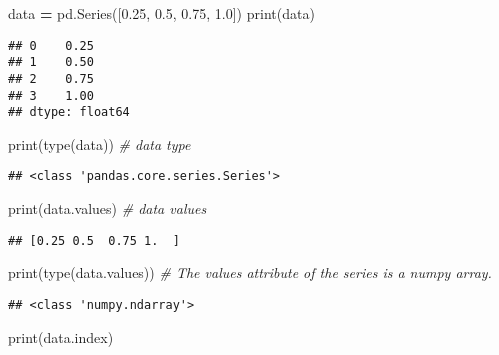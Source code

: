 \documentclass[
]{book}
\newenvironment{Shaded}{\begin{snugshade}}{\end{snugshade}}
\newcommand{\BuiltInTok}[1]{#1}
\newcommand{\CommentTok}[1]{\textcolor[rgb]{0.56,0.35,0.01}{\textit{#1}}}
\newcommand{\FloatTok}[1]{\textcolor[rgb]{0.00,0.00,0.81}{#1}}
\newcommand{\NormalTok}[1]{#1}
\newcommand{\OperatorTok}[1]{\textcolor[rgb]{0.81,0.36,0.00}{\textbf{#1}}}
\begin{document}
\begin{Shaded}
\begin{Highlighting}[]
\NormalTok{data }\OperatorTok{=}\NormalTok{ pd.Series([}\FloatTok{0.25}\NormalTok{, }\FloatTok{0.5}\NormalTok{, }\FloatTok{0.75}\NormalTok{, }\FloatTok{1.0}\NormalTok{])}
\BuiltInTok{print}\NormalTok{(data)}
\end{Highlighting}
\end{Shaded}

\begin{verbatim}
## 0    0.25
## 1    0.50
## 2    0.75
## 3    1.00
## dtype: float64
\end{verbatim}

\begin{Shaded}
\begin{Highlighting}[]
\BuiltInTok{print}\NormalTok{(}\BuiltInTok{type}\NormalTok{(data)) }\CommentTok{\# data type}
\end{Highlighting}
\end{Shaded}

\begin{verbatim}
## <class 'pandas.core.series.Series'>
\end{verbatim}

\begin{Shaded}
\begin{Highlighting}[]
\BuiltInTok{print}\NormalTok{(data.values) }\CommentTok{\# data values}
\end{Highlighting}
\end{Shaded}

\begin{verbatim}
## [0.25 0.5  0.75 1.  ]
\end{verbatim}

\begin{Shaded}
\begin{Highlighting}[]
\BuiltInTok{print}\NormalTok{(}\BuiltInTok{type}\NormalTok{(data.values)) }\CommentTok{\# The values attribute of the series is a numpy array.}
\end{Highlighting}
\end{Shaded}

\begin{verbatim}
## <class 'numpy.ndarray'>
\end{verbatim}

\begin{Shaded}
\begin{Highlighting}[]
\BuiltInTok{print}\NormalTok{(data.index) }
\end{Highlighting}
\end{Shaded}
\end{document}
